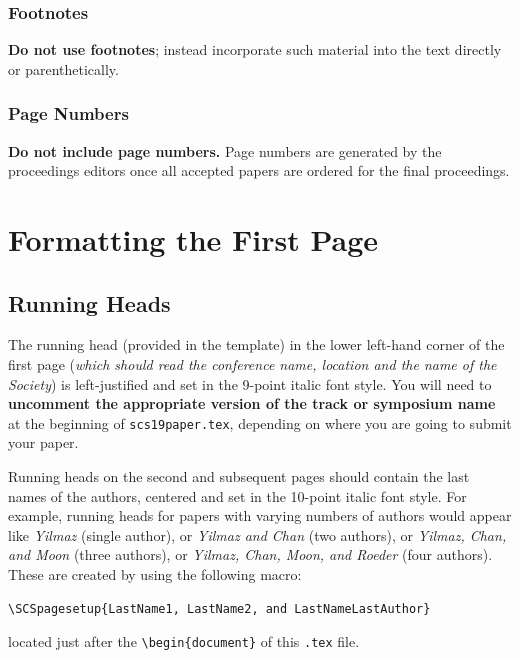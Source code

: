 \documentclass{scspaperproc}
\theoremstyle{scsthe}
\begin{document}
\subsubsection{Footnotes}
\textbf{Do not use footnotes}; instead incorporate such material into the text directly or parenthetically.

\subsubsection{Page Numbers}
\textbf{Do not include page numbers.} Page numbers are generated by the proceedings editors once all accepted papers are ordered for the final proceedings.


\section{Formatting the First Page}

\subsection{Running Heads}
The running head (provided in the template) in the lower left-hand corner of the first page (\textit{which should read the conference name, location and the name of the Society}) is left-justified and set in the 9-point italic font style. %
You will need to \textbf{uncomment the appropriate version of the track or symposium name} at the beginning of \texttt{scs19paper.tex}, depending on where you are going to submit your paper.

Running heads on the second and subsequent pages should contain the last names of the authors, centered and set in the 10-point italic font style. For example, running heads for papers with varying numbers of authors would appear like \emph{Yilmaz} (single author), or \emph{Yilmaz and Chan} (two authors), or \emph{Yilmaz, Chan, and Moon} (three authors), or \emph{Yilmaz, Chan, Moon, and Roeder} (four authors). These are created by using the following macro:

\noindent \begin{verbatim}
\SCSpagesetup{LastName1, LastName2, and LastNameLastAuthor}
\end{verbatim}

located just after the \verb+\begin{document}+ of this \texttt{.tex} file.
\end{document}
